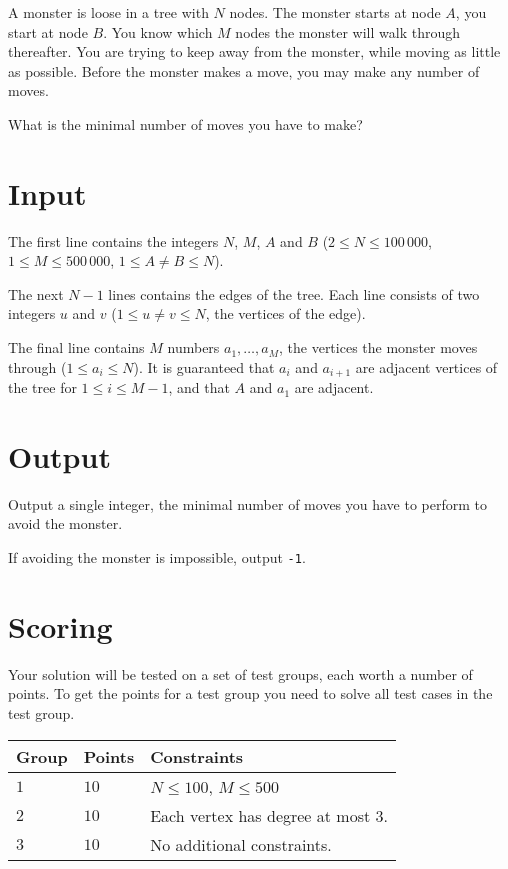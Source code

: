 A monster is loose in a tree with $N$ nodes. The monster starts at node $A$, you start at node $B$. You know which $M$ nodes the monster will walk through thereafter.
You are trying to keep away from the monster, while moving as little as possible. Before the monster makes a move, you may make any number of moves.

What is the minimal number of moves you have to make?

\section*{Input}
The first line contains the integers $N$, $M$, $A$ and $B$ ($2 \le N \le 100\,000$, $1 \le M \le 500\,000$, $1 \le A \neq B \le N$). 

The next $N-1$ lines contains the edges of the tree.
Each line consists of two integers $u$ and $v$ ($1 \le u \neq v \le N$, the vertices of the edge).

The final line contains $M$ numbers $a_1, \dots, a_M$, the vertices the monster moves through ($1 \le a_i \le N$).
It is guaranteed that $a_i$ and $a_{i+1}$ are adjacent vertices of the tree for $1 \le i \le M-1$, and that $A$ and $a_1$ are adjacent.

\section*{Output}
Output a single integer, the minimal number of moves you have to perform to avoid the monster.

If avoiding the monster is impossible, output \texttt{-1}.

\section*{Scoring}
Your solution will be tested on a set of test groups, each worth a number of points.
To get the points for a test group you need to solve all test cases in the test group.

\noindent
\begin{tabular}{| l | l | p{10cm} |}
  \hline
  Group & Points & Constraints \\ \hline
  $1$   & $10$   & $N \le 100$, $M \le 500$ \\ \hline
  $2$   & $10$   & Each vertex has degree at most $3$. \\ \hline
  $3$   & $10$   & No additional constraints. \\ \hline
\end{tabular}
